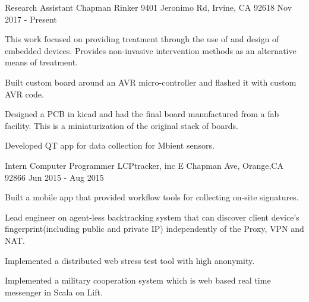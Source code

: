 

\begin{cventries}

  \cventry
    {Research Assistant} %
    {Chapman Rinker} %
    {9401 Jeronimo Rd, Irvine, CA 92618} %
    {Nov 2017 - Present} %
    {
      \begin{cvitems} %
        \item{This work focused on providing treatment through the use of and design of embedded devices. Provides non-invasive intervention methods as an alternative means of treatment.}
        \item {Built custom board around an AVR micro-controller and flashed it with custom AVR code.}
        \item {Designed a PCB in kicad and had the final board manufactured from a fab facility. This is a miniaturization of the original stack of boards.}
        \item {Developed QT app for data collection for Mbient sensors.}
      \end{cvitems}
    }

  \cventry
    {Intern Computer Programmer} %
    {LCPtracker, inc} %
    {E Chapman Ave, Orange,CA 92866} %
    {Jun 2015 - Aug 2015} %
    {
      \begin{cvitems} %
        \item{ Built a mobile app that provided workflow tools for collecting on-site signatures.}
        \item {Lead engineer on agent-less backtracking system that can discover client device's fingerprint(including public and private IP) independently of the Proxy, VPN and NAT.}
        \item {Implemented a distributed web stress test tool with high anonymity.}
        \item {Implemented a military cooperation system which is web based real time messenger in Scala on Lift.}
      \end{cvitems}
    }


\end{cventries}

